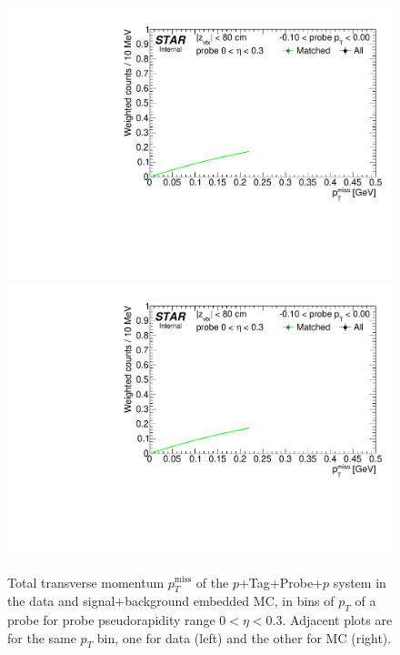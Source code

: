 %
\begin{figure}[h!]
\caption[Tag\&Probe fits to $p_{T}^{\text{miss}}$ in bins of probe $p_{T}$.]{Total transverse momentum $p_{T}^{\text{miss}}$ of the $p$+Tag+Probe+$p$ system in the data and signal+background embedded MC, in bins of $p_{T}$ of a probe for probe pseudorapidity range $0<\eta<0.3$. Adjacent plots are for the same $p_{T}$ bin, one for data (left) and the other for MC (right).}\label{fig:tagAndProbeTofEffFits_Pt_BinB}
\centering
\parbox{0.24\textwidth}{ 
  \centering
  \includegraphics[width=\linewidth,page=5]{graphics/correctionsToEff/TOF_tagAndProbe/Fitting_effVsPt_data_ETABINS_B.CPT2.pdf}\\
  \includegraphics[width=\linewidth,page=7]{graphics/correctionsToEff/TOF_tagAndProbe/Fitting_effVsPt_data_ETABINS_B.CPT2.pdf}\\
}
\end{figure}
